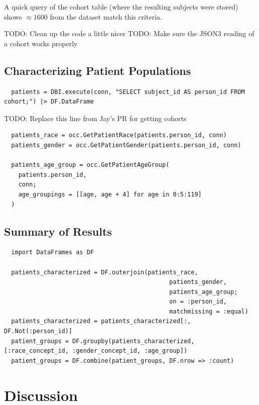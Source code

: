 \documentclass{juliacon}
\begin{document}
A quick query of the cohort table (where the resulting subjects were stored) shows $\approx 1600$ from the dataset match this criteria.

TODO: Clean up the code a little nicer
TODO: Make sure the JSON3 reading of a cohort works properly

\subsection{Characterizing Patient Populations}

\begin{verbatim}
  patients = DBI.execute(conn, "SELECT subject_id AS person_id FROM cohort;") |> DF.DataFrame
\end{verbatim}

TODO: Replace this line from Jay's PR for getting cohorts

\begin{verbatim}
  patients_race = occ.GetPatientRace(patients.person_id, conn)
  patients_gender = occ.GetPatientGender(patients.person_id, conn)

  patients_age_group = occ.GetPatientAgeGroup(
    patients.person_id, 
    conn; 
    age_groupings = [[age, age + 4] for age in 0:5:119]
  )
\end{verbatim}

\subsection{Summary of Results}

\begin{verbatim}
  import DataFrames as DF

  patients_characterized = DF.outerjoin(patients_race,
                                              patients_gender,
                                              patients_age_group;
                                              on = :person_id, 
                                              matchmissing = :equal)
  patients_characterized = patients_characterized[:, DF.Not(:person_id)]
  patient_groups = DF.groupby(patients_characterized, [:race_concept_id, :gender_concept_id, :age_group])
  patient_groups = DF.combine(patient_groups, DF.nrow => :count)
\end{verbatim}

\section{Discussion}
\end{document}
